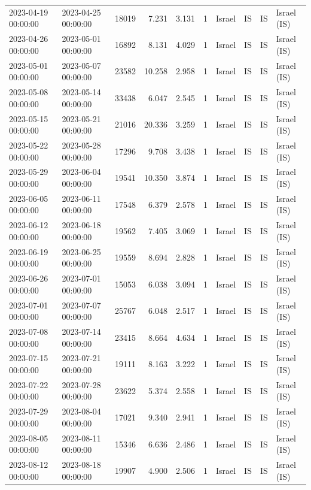 \begin{tabular}{llrrrlllll}
2023-04-19 00:00:00 & 2023-04-25 00:00:00 & 18019 & 7.231 & 3.131 & 1 & Israel & IS & IS & Israel (IS) \\
2023-04-26 00:00:00 & 2023-05-01 00:00:00 & 16892 & 8.131 & 4.029 & 1 & Israel & IS & IS & Israel (IS) \\
2023-05-01 00:00:00 & 2023-05-07 00:00:00 & 23582 & 10.258 & 2.958 & 1 & Israel & IS & IS & Israel (IS) \\
2023-05-08 00:00:00 & 2023-05-14 00:00:00 & 33438 & 6.047 & 2.545 & 1 & Israel & IS & IS & Israel (IS) \\
2023-05-15 00:00:00 & 2023-05-21 00:00:00 & 21016 & 20.336 & 3.259 & 1 & Israel & IS & IS & Israel (IS) \\
2023-05-22 00:00:00 & 2023-05-28 00:00:00 & 17296 & 9.708 & 3.438 & 1 & Israel & IS & IS & Israel (IS) \\
2023-05-29 00:00:00 & 2023-06-04 00:00:00 & 19541 & 10.350 & 3.874 & 1 & Israel & IS & IS & Israel (IS) \\
2023-06-05 00:00:00 & 2023-06-11 00:00:00 & 17548 & 6.379 & 2.578 & 1 & Israel & IS & IS & Israel (IS) \\
2023-06-12 00:00:00 & 2023-06-18 00:00:00 & 19562 & 7.405 & 3.069 & 1 & Israel & IS & IS & Israel (IS) \\
2023-06-19 00:00:00 & 2023-06-25 00:00:00 & 19559 & 8.694 & 2.828 & 1 & Israel & IS & IS & Israel (IS) \\
2023-06-26 00:00:00 & 2023-07-01 00:00:00 & 15053 & 6.038 & 3.094 & 1 & Israel & IS & IS & Israel (IS) \\
2023-07-01 00:00:00 & 2023-07-07 00:00:00 & 25767 & 6.048 & 2.517 & 1 & Israel & IS & IS & Israel (IS) \\
2023-07-08 00:00:00 & 2023-07-14 00:00:00 & 23415 & 8.664 & 4.634 & 1 & Israel & IS & IS & Israel (IS) \\
2023-07-15 00:00:00 & 2023-07-21 00:00:00 & 19111 & 8.163 & 3.222 & 1 & Israel & IS & IS & Israel (IS) \\
2023-07-22 00:00:00 & 2023-07-28 00:00:00 & 23622 & 5.374 & 2.558 & 1 & Israel & IS & IS & Israel (IS) \\
2023-07-29 00:00:00 & 2023-08-04 00:00:00 & 17021 & 9.340 & 2.941 & 1 & Israel & IS & IS & Israel (IS) \\
2023-08-05 00:00:00 & 2023-08-11 00:00:00 & 15346 & 6.636 & 2.486 & 1 & Israel & IS & IS & Israel (IS) \\
2023-08-12 00:00:00 & 2023-08-18 00:00:00 & 19907 & 4.900 & 2.506 & 1 & Israel & IS & IS & Israel (IS) \\

\end{tabular}
